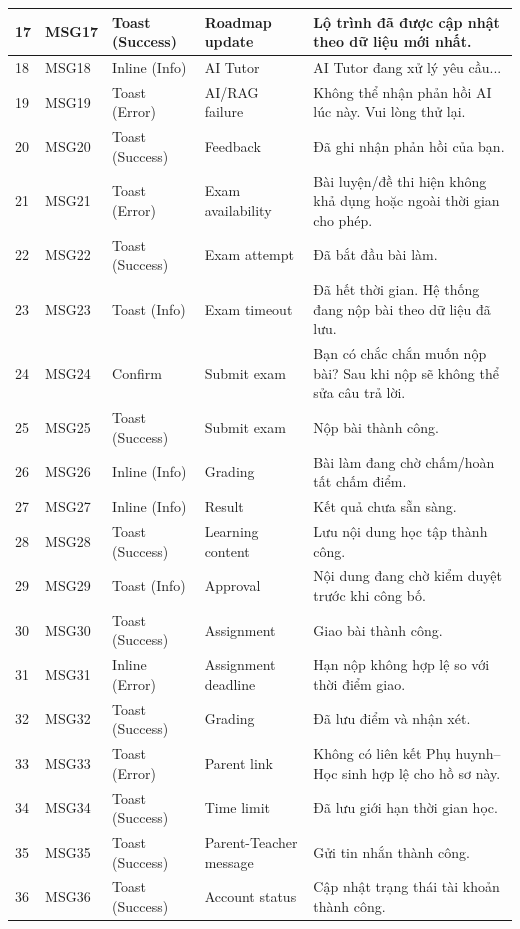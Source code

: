 \documentclass[12pt,a4paper,oneside]{report}
\begin{document}
{\begin{longtable}{|p{0.7cm}|p{1.25cm}|p{2.0cm}|p{2.6cm}|p{6.4cm}|}
17 & MSG17 & Toast (Success) & Roadmap update & Lộ trình đã được cập nhật theo dữ liệu mới nhất. \\ \hline
18 & MSG18 & Inline (Info) & AI Tutor & AI Tutor đang xử lý yêu cầu... \\ \hline
19 & MSG19 & Toast (Error) & AI/RAG failure & Không thể nhận phản hồi AI lúc này. Vui lòng thử lại. \\ \hline
20 & MSG20 & Toast (Success) & Feedback & Đã ghi nhận phản hồi của bạn. \\ \hline
21 & MSG21 & Toast (Error) & Exam availability & Bài luyện/đề thi hiện không khả dụng hoặc ngoài thời gian cho phép. \\ \hline
22 & MSG22 & Toast (Success) & Exam attempt & Đã bắt đầu bài làm. \\ \hline
23 & MSG23 & Toast (Info) & Exam timeout & Đã hết thời gian. Hệ thống đang nộp bài theo dữ liệu đã lưu. \\ \hline
24 & MSG24 & Confirm & Submit exam & Bạn có chắc chắn muốn nộp bài? Sau khi nộp sẽ không thể sửa câu trả lời. \\ \hline
25 & MSG25 & Toast (Success) & Submit exam & Nộp bài thành công. \\ \hline
26 & MSG26 & Inline (Info) & Grading & Bài làm đang chờ chấm/hoàn tất chấm điểm. \\ \hline
27 & MSG27 & Inline (Info) & Result & Kết quả chưa sẵn sàng. \\ \hline
28 & MSG28 & Toast (Success) & Learning content & Lưu nội dung học tập thành công. \\ \hline
29 & MSG29 & Toast (Info) & Approval & Nội dung đang chờ kiểm duyệt trước khi công bố. \\ \hline
30 & MSG30 & Toast (Success) & Assignment & Giao bài thành công. \\ \hline
31 & MSG31 & Inline (Error) & Assignment deadline & Hạn nộp không hợp lệ so với thời điểm giao. \\ \hline
32 & MSG32 & Toast (Success) & Grading & Đã lưu điểm và nhận xét. \\ \hline
33 & MSG33 & Toast (Error) & Parent link & Không có liên kết Phụ huynh--Học sinh hợp lệ cho hồ sơ này. \\ \hline
34 & MSG34 & Toast (Success) & Time limit & Đã lưu giới hạn thời gian học. \\ \hline
35 & MSG35 & Toast (Success) & Parent-Teacher message & Gửi tin nhắn thành công. \\ \hline
36 & MSG36 & Toast (Success) & Account status & Cập nhật trạng thái tài khoản thành công. \\ \hline

\end{longtable}}
\end{document}
